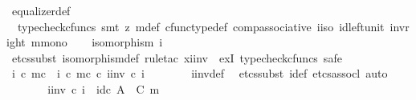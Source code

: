 \begin{isabellebody}
\ equalizer{\isacharunderscore}{\kern0pt}def\isanewline
\ \ \ \ \isamarkupfalse%
\ {\isacharparenleft}{\kern0pt}{\isacharminus}{\kern0pt}{\isacharcomma}{\kern0pt}\ typecheck{\isacharunderscore}{\kern0pt}cfuncs{\isacharcomma}{\kern0pt}\ smt\ {\isacharparenleft}{\kern0pt}z{}{\isacharparenright}{\kern0pt}\ {\isasymchi}m{\isacharunderscore}{\kern0pt}def\ cfunc{\isacharunderscore}{\kern0pt}type{\isacharunderscore}{\kern0pt}def\ comp{\isacharunderscore}{\kern0pt}associative{}\ i{\isacharunderscore}{\kern0pt}iso\ id{\isacharunderscore}{\kern0pt}left{\isacharunderscore}{\kern0pt}unit{}\ inv{\isacharunderscore}{\kern0pt}right\ m{\isacharunderscore}{\kern0pt}mono{\isacharparenright}{\kern0pt}\isanewline
\isanewline
\ \ \isamarkupfalse%
\ {\isachardoublequoteopen}isomorphism\ i{\isacharprime}{\kern0pt}{\isachardoublequoteclose}\isanewline
\ \ \isamarkupfalse%
\ {\isacharparenleft}{\kern0pt}etcs{\isacharunderscore}{\kern0pt}subst\ isomorphism{\isacharunderscore}{\kern0pt}def{}{\isacharcomma}{\kern0pt}\ rule{\isacharunderscore}{\kern0pt}tac\ x{\isacharequal}{\kern0pt}{\isachardoublequoteopen}i{\isacharprime}{\kern0pt}{\isacharunderscore}{\kern0pt}inv{\isachardoublequoteclose}\ \ exI{\isacharcomma}{\kern0pt}\ typecheck{\isacharunderscore}{\kern0pt}cfuncs{\isacharcomma}{\kern0pt}\ safe{\isacharparenright}{\kern0pt}\isanewline
\ \ \ \ \isamarkupfalse%
\ {\isachardoublequoteopen}i\ {\isasymcirc}\isactrlsub c\ m\isactrlsup c\ {\isacharequal}{\kern0pt}\ {\isacharparenleft}{\kern0pt}i\ {\isasymcirc}\isactrlsub c\ m\isactrlsup c{\isacharparenright}{\kern0pt}\ {\isasymcirc}\isactrlsub c\ i{\isacharprime}{\kern0pt}{\isacharunderscore}{\kern0pt}inv\ {\isasymcirc}\isactrlsub c\ i{\isacharprime}{\kern0pt}{\isachardoublequoteclose}\isanewline
\ \ \ \ \ \ \isamarkupfalse%
\ i{\isacharprime}{\kern0pt}{\isacharunderscore}{\kern0pt}inv{\isacharunderscore}{\kern0pt}def\ \isamarkupfalse%
\ {\isacharparenleft}{\kern0pt}etcs{\isacharunderscore}{\kern0pt}subst\ i{\isacharprime}{\kern0pt}{\isacharunderscore}{\kern0pt}def{\isacharcomma}{\kern0pt}\ etcs{\isacharunderscore}{\kern0pt}assocl{\isacharcomma}{\kern0pt}\ auto{\isacharparenright}{\kern0pt}\isanewline
\ \ \ \ \isamarkupfalse%
\ \isamarkupfalse%
\ {\isachardoublequoteopen}i{\isacharprime}{\kern0pt}{\isacharunderscore}{\kern0pt}inv\ {\isasymcirc}\isactrlsub c\ i{\isacharprime}{\kern0pt}\ {\isacharequal}{\kern0pt}\ id\isactrlsub c\ {\isacharparenleft}{\kern0pt}A\ {\isasymsetminus}\ {\isacharparenleft}{\kern0pt}C{\isacharcomma}{\kern0pt}\ m{\isacharparenright}{\kern0pt}{\isacharparenright}{\kern0pt}{\isachardoublequoteclose}\isanewline

\end{isabellebody}
